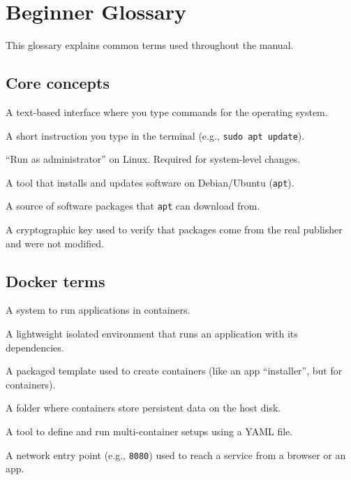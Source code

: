 \chapter{Beginner Glossary}
\label{app:glossary}



This glossary explains common terms used throughout the manual.

\section*{Core concepts}

\begin{description}[leftmargin=!,labelwidth=4cm]
  \item[Terminal] A text-based interface where you type commands for the operating system.
  \item[Command] A short instruction you type in the terminal (e.g., \texttt{sudo apt update}).
  \item[sudo] ``Run as administrator'' on Linux. Required for system-level changes.
  \item[Package manager (APT)] A tool that installs and updates software on Debian/Ubuntu (\texttt{apt}).
  \item[Repository] A source of software packages that \texttt{apt} can download from.
  \item[GPG key] A cryptographic key used to verify that packages come from the real publisher and were not modified.
\end{description}

\section*{Docker terms}

\begin{description}[leftmargin=!,labelwidth=4cm]
  \item[Docker] A system to run applications in containers.
  \item[Container] A lightweight isolated environment that runs an application with its dependencies.
  \item[Image] A packaged template used to create containers (like an app ``installer'', but for containers).
  \item[Volume] A folder where containers store persistent data on the host disk.
  \item[Docker Compose] A tool to define and run multi-container setups using a YAML file.
  \item[Port] A network entry point (e.g., \texttt{8080}) used to reach a service from a browser or an app.
\end{description}

